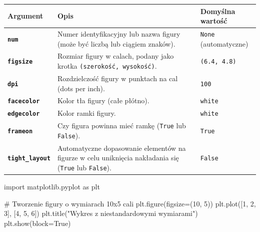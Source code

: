\documentclass[
  polish,
  letterpaper,
  DIV=11,
  numbers=noendperiod]{scrreprt}
\newenvironment{Shaded}{\begin{snugshade}}{\end{snugshade}}
\newcommand{\CommentTok}[1]{\textcolor[rgb]{0.37,0.37,0.37}{#1}}
\newcommand{\DecValTok}[1]{\textcolor[rgb]{0.68,0.00,0.00}{#1}}
\newcommand{\ImportTok}[1]{\textcolor[rgb]{0.00,0.46,0.62}{#1}}
\newcommand{\NormalTok}[1]{\textcolor[rgb]{0.00,0.23,0.31}{#1}}
\newcommand{\OperatorTok}[1]{\textcolor[rgb]{0.37,0.37,0.37}{#1}}
\newcommand{\StringTok}[1]{\textcolor[rgb]{0.13,0.47,0.30}{#1}}
\newcommand{\VariableTok}[1]{\textcolor[rgb]{0.07,0.07,0.07}{#1}}
\begin{document}
\begin{longtable}[]{@{}
  >{\raggedright\arraybackslash}p{}
  >{\raggedright\arraybackslash}p{}
  >{\raggedright\arraybackslash}p{}@{}}
\toprule\noalign{}
\begin{minipage}[b]{\linewidth}\raggedright
Argument
\end{minipage} & \begin{minipage}[b]{\linewidth}\raggedright
Opis
\end{minipage} & \begin{minipage}[b]{\linewidth}\raggedright
Domyślna wartość
\end{minipage} \\
\midrule\noalign{}
\endhead
\bottomrule\noalign{}
\endlastfoot
\textbf{\texttt{num}} & Numer identyfikacyjny lub nazwa figury (może być
liczbą lub ciągiem znaków). & \texttt{None} (automatyczne) \\
\textbf{\texttt{figsize}} & Rozmiar figury w calach, podany jako krotka
\texttt{(szerokość,\ wysokość)}. & \texttt{(6.4,\ 4.8)} \\
\textbf{\texttt{dpi}} & Rozdzielczość figury w punktach na cal (dots per
inch). & \texttt{100} \\
\textbf{\texttt{facecolor}} & Kolor tła figury (całe płótno). &
\texttt{white} \\
\textbf{\texttt{edgecolor}} & Kolor ramki figury. & \texttt{white} \\
\textbf{\texttt{frameon}} & Czy figura powinna mieć ramkę (\texttt{True}
lub \texttt{False}). & \texttt{True} \\
\textbf{\texttt{tight\_layout}} & Automatyczne dopasowanie elementów na
figurze w celu uniknięcia nakładania się (\texttt{True} lub
\texttt{False}). & \texttt{False} \\
\end{longtable}

\begin{Shaded}
\begin{Highlighting}[]
\ImportTok{import}\NormalTok{ matplotlib.pyplot }\ImportTok{as}\NormalTok{ plt}

\CommentTok{\# Tworzenie figury o wymiarach 10x5 cali}
\NormalTok{plt.figure(figsize}\OperatorTok{=}\NormalTok{(}\DecValTok{10}\NormalTok{, }\DecValTok{5}\NormalTok{))}
\NormalTok{plt.plot([}\DecValTok{1}\NormalTok{, }\DecValTok{2}\NormalTok{, }\DecValTok{3}\NormalTok{], [}\DecValTok{4}\NormalTok{, }\DecValTok{5}\NormalTok{, }\DecValTok{6}\NormalTok{])}
\NormalTok{plt.title(}\StringTok{"Wykres z niestandardowymi wymiarami"}\NormalTok{)}
\NormalTok{plt.show(block}\OperatorTok{=}\VariableTok{True}\NormalTok{)}
\end{Highlighting}
\end{Shaded}
\end{document}
